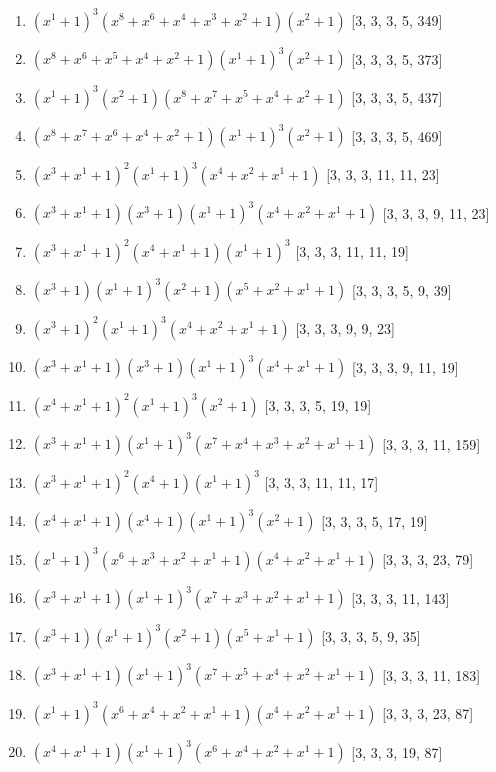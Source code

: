 \documentclass[10pt,twocolumn]{article}
\begin{document}
\begin{enumerate}
\item $(x^{1} + 1)^{3}(x^{8} + x^{6} + x^{4} + x^{3} + x^{2} + 1)(x^{2} + 1)$  [3, 3, 3, 5, 349]
\item $(x^{8} + x^{6} + x^{5} + x^{4} + x^{2} + 1)(x^{1} + 1)^{3}(x^{2} + 1)$  [3, 3, 3, 5, 373]
\item $(x^{1} + 1)^{3}(x^{2} + 1)(x^{8} + x^{7} + x^{5} + x^{4} + x^{2} + 1)$  [3, 3, 3, 5, 437]
\item $(x^{8} + x^{7} + x^{6} + x^{4} + x^{2} + 1)(x^{1} + 1)^{3}(x^{2} + 1)$  [3, 3, 3, 5, 469]
\item $(x^{3} + x^{1} + 1)^{2}(x^{1} + 1)^{3}(x^{4} + x^{2} + x^{1} + 1)$  [3, 3, 3, 11, 11, 23]
\item $(x^{3} + x^{1} + 1)(x^{3} + 1)(x^{1} + 1)^{3}(x^{4} + x^{2} + x^{1} + 1)$  [3, 3, 3, 9, 11, 23]
\item $(x^{3} + x^{1} + 1)^{2}(x^{4} + x^{1} + 1)(x^{1} + 1)^{3}$  [3, 3, 3, 11, 11, 19]
\item $(x^{3} + 1)(x^{1} + 1)^{3}(x^{2} + 1)(x^{5} + x^{2} + x^{1} + 1)$  [3, 3, 3, 5, 9, 39]
\item $(x^{3} + 1)^{2}(x^{1} + 1)^{3}(x^{4} + x^{2} + x^{1} + 1)$  [3, 3, 3, 9, 9, 23]
\item $(x^{3} + x^{1} + 1)(x^{3} + 1)(x^{1} + 1)^{3}(x^{4} + x^{1} + 1)$  [3, 3, 3, 9, 11, 19]
\item $(x^{4} + x^{1} + 1)^{2}(x^{1} + 1)^{3}(x^{2} + 1)$  [3, 3, 3, 5, 19, 19]
\item $(x^{3} + x^{1} + 1)(x^{1} + 1)^{3}(x^{7} + x^{4} + x^{3} + x^{2} + x^{1} + 1)$  [3, 3, 3, 11, 159]
\item $(x^{3} + x^{1} + 1)^{2}(x^{4} + 1)(x^{1} + 1)^{3}$  [3, 3, 3, 11, 11, 17]
\item $(x^{4} + x^{1} + 1)(x^{4} + 1)(x^{1} + 1)^{3}(x^{2} + 1)$  [3, 3, 3, 5, 17, 19]
\item $(x^{1} + 1)^{3}(x^{6} + x^{3} + x^{2} + x^{1} + 1)(x^{4} + x^{2} + x^{1} + 1)$  [3, 3, 3, 23, 79]
\item $(x^{3} + x^{1} + 1)(x^{1} + 1)^{3}(x^{7} + x^{3} + x^{2} + x^{1} + 1)$  [3, 3, 3, 11, 143]
\item $(x^{3} + 1)(x^{1} + 1)^{3}(x^{2} + 1)(x^{5} + x^{1} + 1)$  [3, 3, 3, 5, 9, 35]
\item $(x^{3} + x^{1} + 1)(x^{1} + 1)^{3}(x^{7} + x^{5} + x^{4} + x^{2} + x^{1} + 1)$  [3, 3, 3, 11, 183]
\item $(x^{1} + 1)^{3}(x^{6} + x^{4} + x^{2} + x^{1} + 1)(x^{4} + x^{2} + x^{1} + 1)$  [3, 3, 3, 23, 87]
\item $(x^{4} + x^{1} + 1)(x^{1} + 1)^{3}(x^{6} + x^{4} + x^{2} + x^{1} + 1)$  [3, 3, 3, 19, 87]

\end{enumerate}
\end{document}
